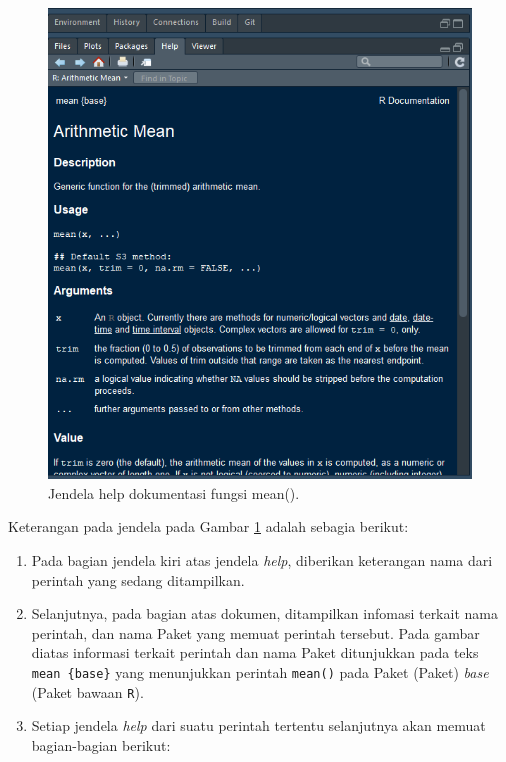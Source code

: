 \documentclass[
]{book}
\providecommand{\tightlist}{%
  \setlength{\itemsep}{0pt}\setlength{\parskip}{0pt}}
\theoremstyle{definition}
\theoremstyle{definition}
\theoremstyle{definition}
\theoremstyle{definition}
\theoremstyle{remark}
\begin{document}
\begin{figure}

{\centering \includegraphics[width=0.5\linewidth]{./images/meandoc} 

}

\caption{Jendela help dokumentasi fungsi mean().}\label{fig:meandoc}
\end{figure}

Keterangan pada jendela pada Gambar \ref{fig:meandoc} adalah sebagia berikut:

\begin{enumerate}
\def\labelenumi{\arabic{enumi}.}
\tightlist
\item
  Pada bagian jendela kiri atas jendela \emph{help}, diberikan keterangan nama dari perintah yang sedang ditampilkan.
\item
  Selanjutnya, pada bagian atas dokumen, ditampilkan infomasi terkait nama perintah, dan nama Paket yang memuat perintah tersebut. Pada gambar diatas informasi terkait perintah dan nama Paket ditunjukkan pada teks \texttt{mean\ \{base\}} yang menunjukkan perintah \texttt{mean()} pada Paket (Paket) \emph{base} (Paket bawaan \texttt{R}).
\item
  Setiap jendela \emph{help} dari suatu perintah tertentu selanjutnya akan memuat bagian-bagian berikut:
\end{enumerate}
\end{document}
